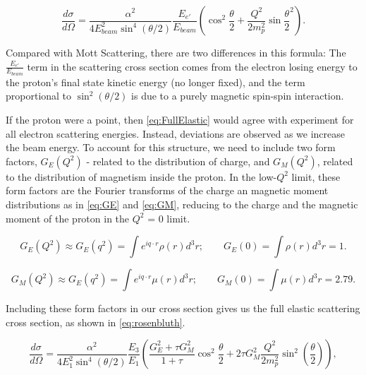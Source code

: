             \begin{equation}\label{eq:FullElastic}
                    \frac{d\sigma}{d\Omega} = \frac{\alpha^2}{4E_{beam}^2\sin^4{(\theta/2)}} \frac{E_{e'}}{E_{beam}} ( \cos^2{\frac{\theta}{2}} + \frac{Q^2}{2m_p^2}\sin{\frac{\theta}{2}}^2 ).
            \end{equation}


            Compared with Mott Scattering, there are two differences in this formula: The $\frac{E_{e'}}{E_{beam}}$ term in the scattering cross section comes from the electron losing energy to the proton's final state kinetic energy (no longer fixed), and the term proportional to $\sin^2(\theta/2)$ is due to a purely magnetic spin-spin interaction. 


            \indent If the proton were a point, then \eqref{eq:FullElastic} would agree with experiment for all electron scattering energies. Instead, deviations are observed as we increase the beam energy. To account for this structure, we need to include two form factors, $G_E(Q^2)$ - related to the distribution of charge, and $G_M(Q^2)$, related to the distribution of magnetism inside the proton. In the low-$Q^2$ limit, these form factors are the Fourier transforms of the charge an magnetic moment distributions as in \eqref{eq:GE} and \ref{eq:GM}, reducing to the charge and the magnetic moment of the proton in the $Q^2$ = 0 limit. %

        \begin{equation}\label{eq:GE}
             G_E(Q^2) \approx G_E(q^2) = \int e^{iq\cdot r} \rho (r) d^3r; \quad \quad    G_E(0) = \int  \rho (r) d^3r = 1. 
        \end{equation}

        \begin{equation}\label{eq:GM}
             G_M(Q^2) \approx G_E(q^2) = \int e^{iq\cdot r} \mu (r) d^3r;  \quad \quad  G_M(0) = \int  \mu (r) d^3r = 2.79.
        \end{equation}
        
        
        Including these form factors in our cross section gives us the full elastic scattering cross section, as shown in \eqref{eq:rosenbluth}.
                
        \begin{equation}\label{eq:rosenbluth}
            \frac{d\sigma}{d\Omega} = \frac{\alpha^2}{4E_1^2\sin^4{(\theta/2)}}\frac{E_3}{E_1}\left( \frac{G_E^2+\tau G_M^2}{1+\tau} \cos^2{\frac{\theta}{2}}+2\tau G_M^2\frac{Q^2}{2m_p^2}\sin^2(\frac{\theta}{2})\right),
        \end{equation}
       
